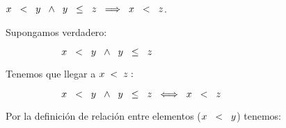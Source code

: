 \documentclass[12pt]{article}
\begin{document}
\hspace{2cm} $x\hspace{0.2cm}<\hspace{0.2cm}y\hspace{0.2cm} \wedge\hspace{0.2cm} y\hspace{0.2cm}\leq\hspace{0.2cm} z\hspace{0.2cm} \Longrightarrow\hspace{0.2cm} x\hspace{0.2cm}<\hspace{0.2cm}z$.
\vspace{0.3cm}

{} 

\vspace{1cm}

Supongamos verdadero:

\begin{center}
    $\hspace{2cm} x\hspace{0.2cm}<\hspace{0.2cm}y\hspace{0.2cm} \wedge\hspace{0.2cm} y\hspace{0.2cm}\leq\hspace{0.2cm} z\hspace{0.2cm}$
\end{center}

Tenemos que llegar a \hspace{0.2cm}$x\hspace{0.1cm}<\hspace{0.1cm}z:$

\begin{center}
    $\hspace{2cm} x\hspace{0.2cm}<\hspace{0.2cm}y\hspace{0.2cm} \wedge\hspace{0.2cm} y\hspace{0.2cm}\leq\hspace{0.2cm} z\hspace{0.2cm}\Longleftrightarrow\hspace{0.2cm} x\hspace{0.2cm}<\hspace{0.2cm}z$ 
\end{center}

Por la definición de relación entre elementos ($x\hspace{0.2cm}<\hspace{0.2cm}y$) tenemos:
\end{document}
